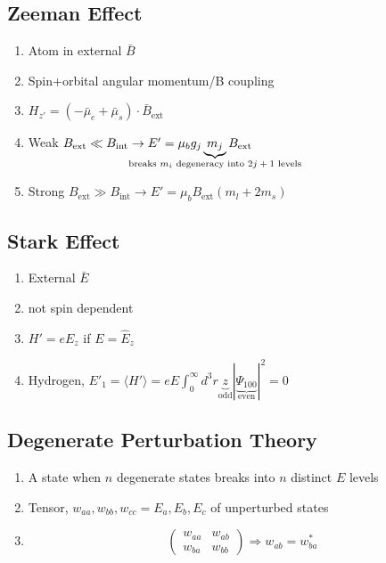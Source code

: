 \documentclass[10pt,letter]{article}
\begin{document}
\subsection{Zeeman Effect}
\begin{enumerate}
    \item Atom in external $\bar{B}$ 
    \item Spin+orbital angular momentum/B coupling\\
    \item $H_{z'} = (-\bar{\mu}_e + \bar{\mu}_s ) \cdot \bar{B}_{\textrm{ext}}$
    \item Weak $B_{\textrm{ext}} \ll B_{\textrm{int}} \rightarrow E' = \mu_b g_j \underbrace{m_j}_{\mathclap{\textrm{breaks $m_i$ degeneracy into $2j+1$ levels}}} B_{\textrm{ext}}$
    \item Strong $B_{\textrm{ext}} \gg B_{\textrm{int}} \rightarrow E' = \mu_b B_{\textrm{ext}}(m_l + 2m_s)$
\end{enumerate} 

\subsection{Stark Effect}
\begin{enumerate}
    \item External $\bar{E}$
    \item not spin dependent
    \item $H' = eE_z$ if $E= \hat{E}_z$
    \item Hydrogen, $E'_1 = \langle H' \rangle = eE\int_0^\infty d^3 r \underbrace{z}_{\textrm{odd}} | \underbrace{\Psi_{100}}_{\textrm{even}}|^2 = 0 $
\end{enumerate}

\subsection{Degenerate Perturbation Theory}
\begin{enumerate}
    \item A state when $n$ degenerate states breaks into $n$ distinct $E$ levels
    \item Tensor, $w_{aa},w_{bb},w_{cc} = E_a,E_b,E_c$ of unperturbed states
    \item \[ \left( \begin{array}{cc}
w_{aa} & w_{ab}  \\
w_{ba} & w_{bb}  \end{array} \right) \Rightarrow w_{ab} = w_{ba}^*\] 
\end{enumerate}
\end{document}
